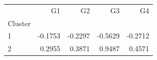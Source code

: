 \begin{tabular}{lrrrr}
\toprule
 & G1 & G2 & G3 & G4 \\
Cluster &  &  &  &  \\
\midrule
1 & -0.1753 & -0.2297 & -0.5629 & -0.2712 \\
2 & 0.2955 & 0.3871 & 0.9487 & 0.4571 \\
\bottomrule
\end{tabular}
